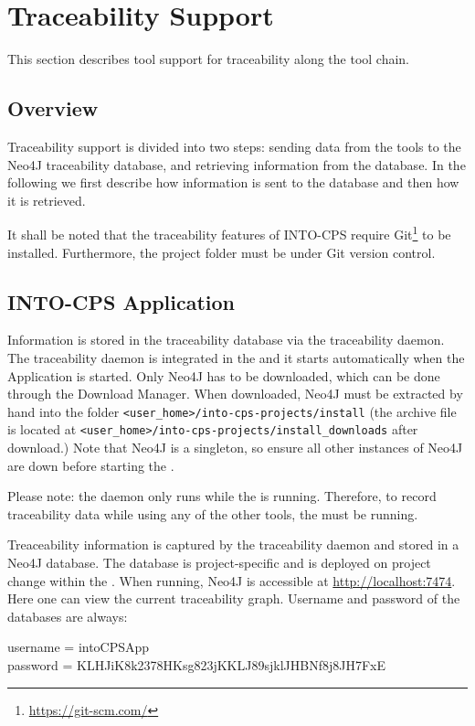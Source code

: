 \section{Traceability Support}\label{sec:traceability}
This section describes tool support for traceability along the \into tool chain.
%
%
%
\subsection{Overview}
Traceability support is divided into two steps: sending data from the tools to the Neo4J traceability database, and retrieving information from the database. In the following we first describe how information is sent to the database and then how it is retrieved.

It shall be noted that the traceability features of INTO-CPS require Git\footnote{\url{https://git-scm.com/}} to be installed. Furthermore, the project folder must be under Git version control.
%
\subsection{INTO-CPS Application}
Information is stored in the traceability database via the traceability daemon.  The traceability daemon is integrated in the \intoapp{} and it starts automatically when the Application is started. Only Neo4J has to be downloaded, which can be done through the Download Manager. When downloaded, Neo4J must be extracted by hand into the folder \texttt{<user\_home>/into-cps-projects/install} (the archive file is located at \texttt{<user\_home>/into-cps-projects/install\_downloads} after download.) Note that Neo4J is a singleton, so ensure all other instances of Neo4J are down before starting the \intoapp. 

Please note: the daemon only runs while the \intoapp{} is running. Therefore, to record traceability data while using any of the other tools, the \intoapp{} must be running.

Treaceability information is captured by the traceability daemon and stored in a Neo4J database. The database is project-specific and is deployed on project change within the \intoapp. When running, Neo4J is accessible at \url{http://localhost:7474}. Here one can view the current traceability graph.  Username and password of the databases are always:

username = intoCPSApp\\
password = KLHJiK8k2378HKsg823jKKLJ89sjklJHBNf8j8JH7FxE\\


